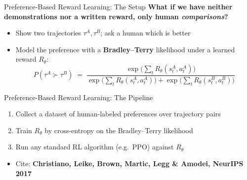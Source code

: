 \begin{frame}{Preference-Based Reward Learning: The Setup}
\textbf{What if we have neither demonstrations nor a written reward, only human \emph{comparisons}?}
\vspace{0.6em}
\begin{itemize}
    \setlength{\itemsep}{0.55em}
    \item Show two trajectories $\tau^A, \tau^B$; ask a human which is better
    \item Model the preference with a \textbf{Bradley--Terry} likelihood under a learned reward $R_\theta$:
    \[
        P(\tau^A \succ \tau^B) \;=\;
        \frac{\exp\!\big(\sum_t R_\theta(s_t^A, a_t^A)\big)}
             {\exp\!\big(\sum_t R_\theta(s_t^A, a_t^A)\big)
            + \exp\!\big(\sum_t R_\theta(s_t^B, a_t^B)\big)}
    \]
\end{itemize}
\end{frame}

\begin{frame}{Preference-Based Reward Learning: The Pipeline}
\begin{enumerate}
    \setlength{\itemsep}{0.6em}
    \item Collect a dataset of human-labeled preferences over trajectory pairs
    \item Train $R_\theta$ by cross-entropy on the Bradley--Terry likelihood
    \item Run any standard RL algorithm (e.g.\ PPO) against $R_\theta$
\end{enumerate}
\vspace{0.7em}
\begin{itemize}
    \item Cite: \textbf{Christiano, Leike, Brown, Martic, Legg \& Amodei, NeurIPS 2017}
\end{itemize}
\end{frame}

